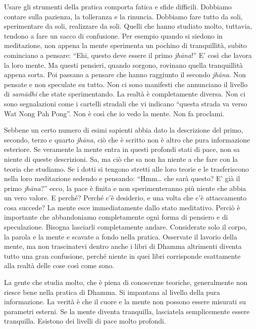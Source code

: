 Usare gli strumenti della pratica comporta fatica e sfide difficili.
Dobbiamo contare sulla pazienza, la tolleranza e la rinuncia. Dobbiamo
fare tutto da soli, sperimentare da soli, realizzare da soli. Quelli che
hanno studiato molto, tuttavia, tendono a fare un sacco di confusione.
Per esempio quando si siedono in meditazione, non appena la mente
sperimenta un pochino di tranquillità, subito cominciano a pensare:
``Ehi, questo deve essere il primo \emph{jhāna}!''%
E' così che lavora la loro mente. Ma questi pensieri, quando sorgono,
rovinano quella tranquillità appena sorta. Poi passano a pensare che
hanno raggiunto il secondo \emph{jhāna}. Non pensate e non speculate su tutto.
Non ci sono manifesti che annunciano il livello di \emph{samādhi} che state
sperimentando. La realtà è completamente diversa. Non ci sono
segnalazioni come i cartelli stradali che vi indicano ``questa strada va
verso Wat Nong Pah Pong''. Non è così che io vedo la mente. Non fa
proclami.

Sebbene un certo numero di esimi sapienti abbia dato la descrizione del
primo, secondo, terzo e quarto \emph{jhāna}, ciò che è scritto non è altro che
pura informazione esteriore. Se veramente la mente entra in questi
profondi stati di pace, non sa niente di queste descrizioni. Sa, ma ciò
che sa non ha niente a che fare con la teoria che studiamo. Se i dotti
si tengono stretti alle loro teorie e le trasferiscono nella loro
meditazione sedendo e pensando: ``Hmm\ldots{} che sarà questo? E' già il
primo \emph{jhāna}?'' ecco, la pace è finita e non sperimenteranno più niente
che abbia un vero valore. E perché? Perché c'è desiderio, e una volta
che c'è attaccamento cosa succede? La mente esce immediatamente dallo
stato meditativo. Perciò è importante che abbandoniamo completamente
ogni forma di pensiero e di speculazione. Bisogna lasciarli
completamente andare. Considerate solo il corpo, la parola e la mente e
scavate a fondo nella pratica. Osservate il lavorio della mente, ma non
trascinatevi dentro anche i libri di Dhamma altrimenti diventa tutto una
gran confusione, perché niente in quei libri corrisponde esattamente
alla realtà delle cose così come sono.

La gente che studia molto, che è piena di conoscenze teoriche,
generalmente non riesce bene nella pratica di Dhamma. Si impantana al
livello della pura informazione. La verità è che il cuore e la mente non
possono essere misurati su parametri esterni. Se la mente diventa
tranquilla, lasciatela semplicemente essere tranquilla. Esistono dei
livelli di pace molto profondi.

